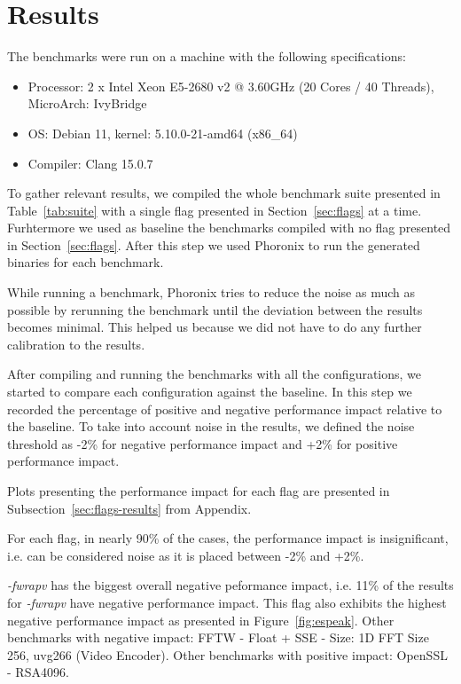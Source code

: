 \section{Results} \label{sec:results}

The benchmarks were run on a machine with the following specifications:
\begin{itemize}
\item Processor: 2 x Intel Xeon E5-2680 v2 @ 3.60GHz (20 Cores / 40 Threads),
MicroArch: IvyBridge
\item OS: Debian 11, kernel: 5.10.0-21-amd64 (x86\_64)
\item Compiler: Clang 15.0.7
\end{itemize}

To gather relevant results, we compiled the whole benchmark suite presented in
Table~\ref{tab:suite} with a single flag presented in Section~\ref{sec:flags} at
a time. Furhtermore we used as baseline the benchmarks compiled with no flag
presented in Section~\ref{sec:flags}. After this step we used Phoronix to run
the generated binaries for each benchmark.

While running a benchmark, Phoronix tries to reduce the noise as much as
possible by rerunning the benchmark until the deviation between the results
becomes minimal. This helped us because we did not have to do any further
calibration to the results.

After compiling and running the benchmarks with all the configurations, we
started to compare each configuration against the baseline. In this step we
recorded the percentage of positive and negative performance impact relative to
the baseline. To take into account noise in the results, we defined the noise
threshold as -2\% for negative performance impact and +2\% for positive
performance impact.

Plots presenting the performance impact for each flag are presented in
Subsection~\ref{sec:flags-results} from Appendix.

For each flag, in nearly 90\% of the cases, the performance impact is
insignificant, i.e. can be considered noise as it is placed between -2\% and
+2\%. 

\textit{-fwrapv} has the biggest overall negative peformance impact, i.e. 11\%
of the results for \textit{-fwrapv} have negative performance impact. This flag
also exhibits the highest negative performance impact as presented in
Figure~\ref{fig:espeak}. Other benchmarks with negative impact: FFTW - Float +
SSE - Size: 1D FFT Size 256, uvg266 (Video Encoder). Other benchmarks with
positive impact: OpenSSL - RSA4096.

